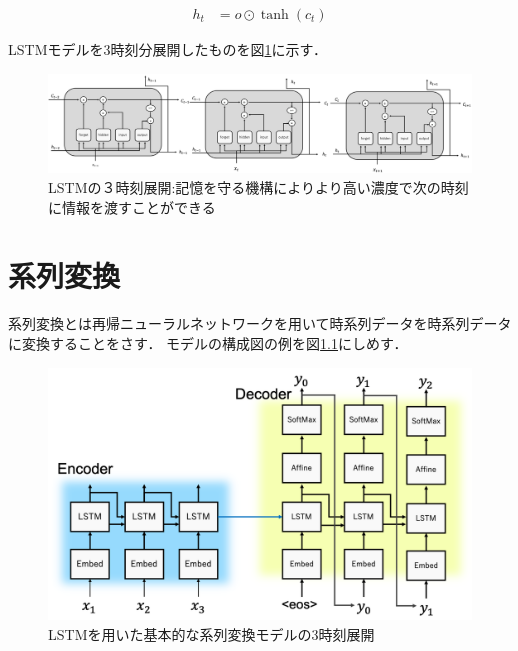 \documentclass[a4j,11pt,report]{jsbook}
\begin{document}
\begin{equation}
  \label{eq:all3}
  \begin{split}
    h_{t} &= o \odot \tanh(c_{t})
  \end{split}
\end{equation}

LSTMモデルを3時刻分展開したものを図\ref{fig:LSTM_3timeconcat}に示す．

\begin{center}
  \begin{figure}
    \centering
    \includegraphics[width=\linewidth]{image/LSTM_concat.png}
    \caption{LSTMの３時刻展開:記憶を守る機構によりより高い濃度で次の時刻に情報を渡すことができる}
    \label{fig:LSTM_3timeconcat}
  \end{figure}
\end{center}






\chapter{系列変換\label{ch:Seq2Seq}}

系列変換とは再帰ニューラルネットワークを用いて時系列データを時系列データに変換することをさす．
モデルの構成図の例を図\ref{fig:seq2seq_3time}にしめす．

\begin{center}
  \begin{figure}[tbh]
    \centering
    \includegraphics[width=\linewidth]{image/seq2seq_image.png}
    \caption{LSTMを用いた基本的な系列変換モデルの3時刻展開　}
    \label{fig:seq2seq_3time}
  \end{figure}
\end{center}
\end{document}
